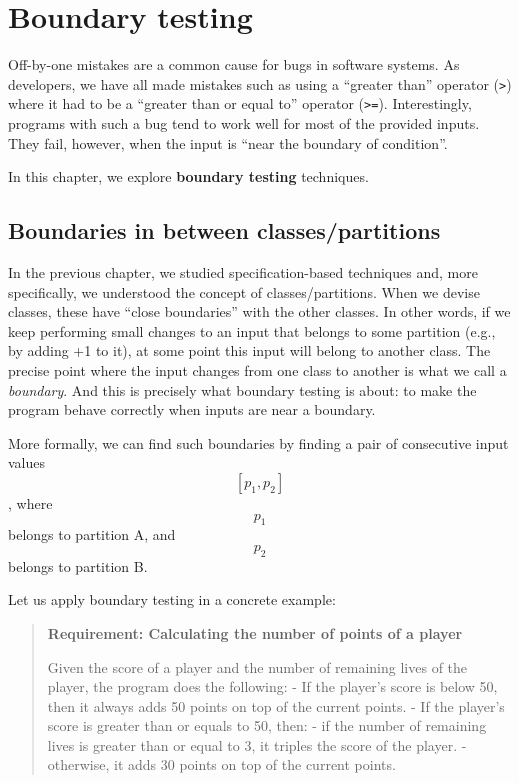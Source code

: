 \hypertarget{boundary-testing}{%
\section{Boundary testing}\label{boundary-testing}}

Off-by-one mistakes are a common cause for bugs in software systems. As
developers, we have all made mistakes such as using a ``greater than''
operator (\texttt{\textgreater{}}) where it had to be a ``greater than
or equal to'' operator (\texttt{\textgreater{}=}). Interestingly,
programs with such a bug tend to work well for most of the provided
inputs. They fail, however, when the input is ``near the boundary of
condition''.

In this chapter, we explore \textbf{boundary testing} techniques.

\hypertarget{boundaries-in-between-classespartitions}{%
\subsection{Boundaries in between
classes/partitions}\label{boundaries-in-between-classespartitions}}

In the previous chapter, we studied specification-based techniques and,
more specifically, we understood the concept of classes/partitions. When
we devise classes, these have ``close boundaries'' with the other
classes. In other words, if we keep performing small changes to an input
that belongs to some partition (e.g., by adding +1 to it), at some point
this input will belong to another class. The precise point where the
input changes from one class to another is what we call a
\emph{boundary}. And this is precisely what boundary testing is about:
to make the program behave correctly when inputs are near a boundary.

More formally, we can find such boundaries by finding a pair of
consecutive input values \[[p_1,p_2]\], where \[p_1\] belongs to
partition A, and \[p_2\] belongs to partition B.

Let us apply boundary testing in a concrete example:

\begin{quote}
\textbf{Requirement: Calculating the number of points of a player}

Given the score of a player and the number of remaining lives of the
player, the program does the following: - If the player's score is below
50, then it always adds 50 points on top of the current points. - If the
player's score is greater than or equals to 50, then: - if the number of
remaining lives is greater than or equal to 3, it triples the score of
the player. - otherwise, it adds 30 points on top of the current points.
\end{quote}

